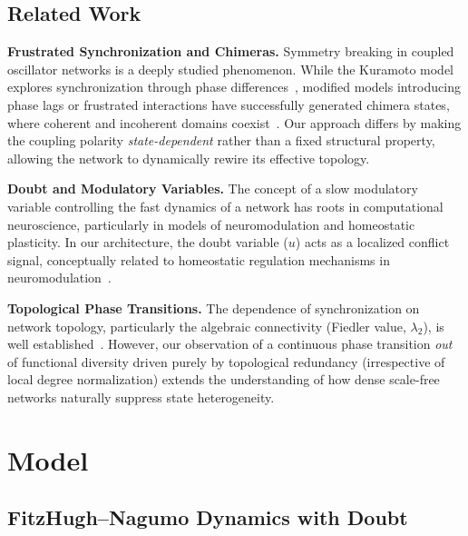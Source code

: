 \documentclass[11pt]{article}
\begin{document}
\subsection{Related Work}
\label{sec:related}
\textbf{Frustrated Synchronization and Chimeras.} Symmetry breaking in coupled oscillator networks is a deeply studied phenomenon. While the Kuramoto model explores synchronization through phase differences~\cite{acebrn2005}, modified models introducing phase lags or frustrated interactions have successfully generated chimera states, where coherent and incoherent domains coexist~\cite{abrams2004}. Our approach differs by making the coupling polarity \emph{state-dependent} rather than a fixed structural property, allowing the network to dynamically rewire its effective topology.

\textbf{Doubt and Modulatory Variables.} The concept of a slow modulatory variable controlling the fast dynamics of a network has roots in computational neuroscience, particularly in models of neuromodulation and homeostatic plasticity. In our architecture, the doubt variable ($u$) acts as a localized conflict signal, conceptually related to homeostatic regulation mechanisms in neuromodulation~\cite{friston2010}.

\textbf{Topological Phase Transitions.} The dependence of synchronization on network topology, particularly the algebraic connectivity (Fiedler value, $\lambda_2$), is well established~\cite{pikovsky2001}. However, our observation of a continuous phase transition \emph{out} of functional diversity driven purely by topological redundancy (irrespective of local degree normalization) extends the understanding of how dense scale-free networks naturally suppress state heterogeneity.
\section{Model}
\label{sec:model}

\subsection{FitzHugh--Nagumo Dynamics with Doubt}
\end{document}
